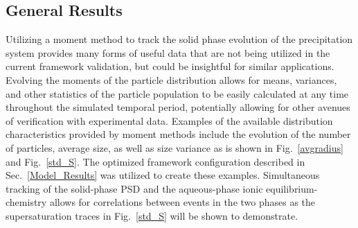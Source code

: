 \documentclass[preprint,3p,a4paper,times,12pt,authoryear]{elsarticle}
\begin{document}
\subsection{General Results}
\label{General_Results}

Utilizing a moment method to track the solid phase evolution of the precipitation system provides many forms of useful data that are not being utilized in the current framework validation, but could be insightful for similar applications.  Evolving the moments of the particle distribution allows for means, variances, and other statistics of the particle population to be easily calculated at any time throughout the simulated temporal period, potentially allowing for other avenues of verification with experimental data.  Examples of the available distribution characteristics provided by moment methods include the evolution of the number of particles, average size, as well as size variance as is shown in Fig.~\ref{avgradius} and Fig.~\ref{std_S}.  The optimized framework configuration described in Sec.~\ref{Model_Results} was utilized to create these examples.  Simultaneous tracking of the solid-phase PSD and the aqueous-phase ionic equilibrium-chemistry allows for correlations between events in the two phases as the supersaturation traces in Fig.~\ref{std_S} will be shown to demonstrate.
\end{document}
